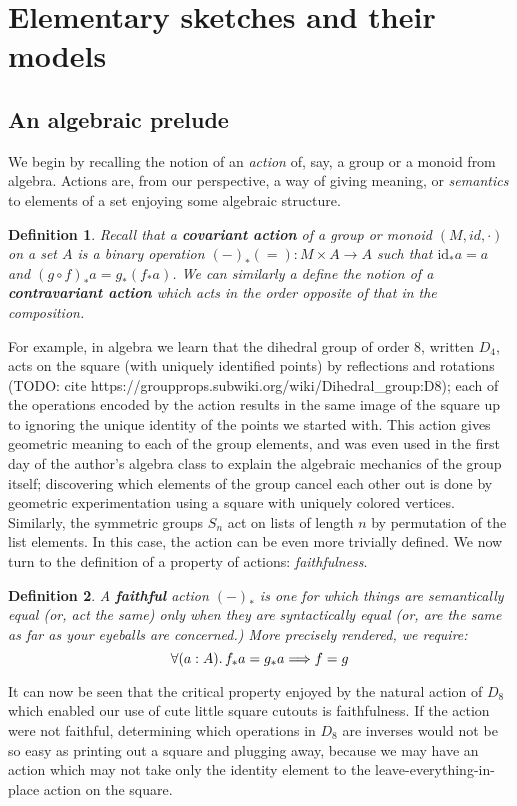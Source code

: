 \documentclass[12pt,twoside]{reedthesis}
\newtheorem{definition}{Definition}
\begin{document}
\section{Elementary sketches and their models}
\subsection{An algebraic prelude}
We begin by recalling the notion of an \emph{action} of, say, a group or a
monoid from algebra. Actions are, from our perspective, a way of giving meaning,
or \emph{semantics} to elements of a set enjoying some algebraic structure.
\begin{definition}
  Recall that a \textbf{covariant action} of a group or monoid \((M, id, \cdot)\) on a
  set \(A\) is a binary operation \((-)_* (=) : M ‌\times A \rightarrow A\) such that
  \(\text{id}_* a = a\) and \( (g \circ f)_* a = g_* (f_* a) \). We can similarly a
  define the notion of a \textbf{contravariant action} which acts in the order
  opposite of that in the composition.
\end{definition}
For example, in algebra we learn that the dihedral group of order 8, written
$D_{4}$, acts on the square (with uniquely identified points) by reflections and
rotations (TODO: cite https://groupprops.subwiki.org/wiki/Dihedral\_group:D8);
each of the operations encoded by the action results in the same image of the
square up to ignoring the unique identity of the points we started with. This
action gives geometric meaning to each of the group elements, and was even used
in the first day of the author's algebra class to explain the algebraic
mechanics of the group itself; discovering which elements of the group cancel
each other out is done by geometric experimentation using a square with uniquely
colored vertices. Similarly, the symmetric groups $S_{n}$ act on lists of length
$n$ by permutation of the list elements. In this case, the action can be even
more trivially defined. We now turn to the definition of a property of actions:
\emph{faithfulness}.

\begin{definition} A \textbf{faithful} action $(-)_{*}$ is one for which things
  are semantically equal (or, act the same) only when they are syntactically
  equal (or, are the same as far as your eyeballs are concerned.) More precisely
  rendered, we require: \[ \forall (a:A)\ldotp f_* a = g_* a \Longrightarrow f = g \]
\end{definition}

It can now be seen that the critical property enjoyed by the natural action of
$D_{8}$ which enabled our use of cute little square cutouts is faithfulness. If
the action were not faithful, determining which operations in $D_{8}$ are
inverses would not be so easy as printing out a square and plugging away,
because we may have an action which may not take only the identity element to
the leave-everything-in-place action on the square.
\end{document}
